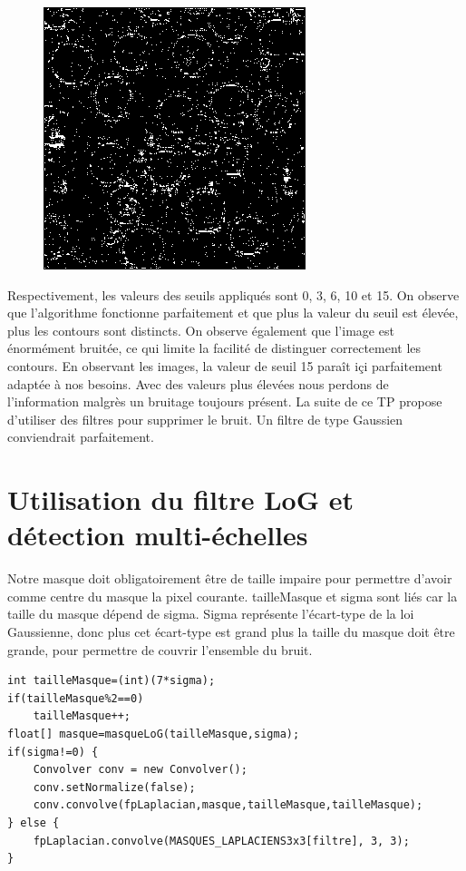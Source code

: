 \documentclass[a4paper,12pt]{report}
\begin{document}
\begin{figure}[!ht]
	\includegraphics[scale=0.5]{image/laplacian_seuil15.png}
\end{figure}

Respectivement, les valeurs des seuils appliqués sont 0, 3, 6, 10 et 15. On observe que l'algorithme fonctionne parfaitement et que plus la valeur du seuil est élevée, plus les contours sont distincts. On observe également que l'image est énormément bruitée, ce qui limite la facilité de  distinguer correctement les contours.
En observant les images, la valeur de seuil 15 paraît içi parfaitement adaptée à nos besoins. Avec des valeurs plus élevées nous perdons de l'information malgrès un bruitage toujours présent.
La suite de ce TP propose d'utiliser des filtres pour supprimer le bruit. Un filtre de type Gaussien conviendrait parfaitement.

\newpage


\section*{Utilisation du filtre LoG et détection multi-échelles}

Notre masque doit obligatoirement être de taille impaire pour permettre d'avoir comme centre du masque la pixel courante.
tailleMasque et sigma sont liés car la taille du masque dépend de sigma. Sigma représente l'écart-type de la loi Gaussienne, donc plus cet écart-type est grand plus la taille du masque doit être grande, pour permettre de couvrir l'ensemble du bruit.


\begin{lstlisting}[style=Java]
int tailleMasque=(int)(7*sigma);
if(tailleMasque%2==0)
	tailleMasque++;
float[] masque=masqueLoG(tailleMasque,sigma);
if(sigma!=0) {
	Convolver conv = new Convolver();
	conv.setNormalize(false);
	conv.convolve(fpLaplacian,masque,tailleMasque,tailleMasque);
} else {
	fpLaplacian.convolve(MASQUES_LAPLACIENS3x3[filtre], 3, 3);
}
\end{lstlisting}
\end{document}

